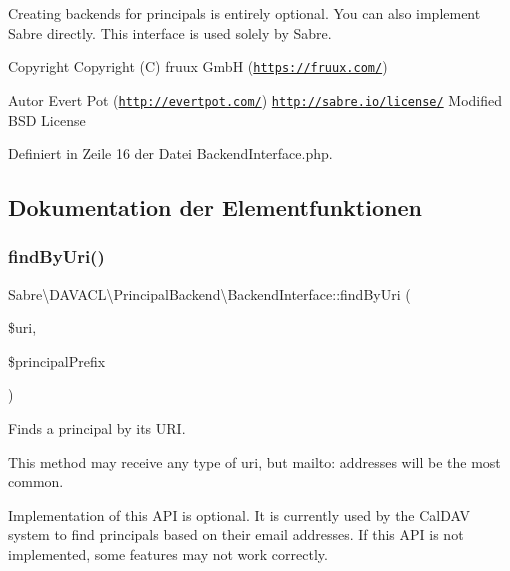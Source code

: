 Creating backends for principals is entirely optional. You can also implement Sabre directly. This interface is used solely by Sabre.

\begin{DoxyCopyright}{Copyright}
Copyright (C) fruux GmbH (\href{https://fruux.com/}{\tt https\+://fruux.\+com/}) 
\end{DoxyCopyright}
\begin{DoxyAuthor}{Autor}
Evert Pot (\href{http://evertpot.com/}{\tt http\+://evertpot.\+com/})  \href{http://sabre.io/license/}{\tt http\+://sabre.\+io/license/} Modified B\+SD License 
\end{DoxyAuthor}


Definiert in Zeile 16 der Datei Backend\+Interface.\+php.



\subsection{Dokumentation der Elementfunktionen}
\mbox{\label{interface_sabre_1_1_d_a_v_a_c_l_1_1_principal_backend_1_1_backend_interface_a949777beae7b9f2478278e080b7abc71}} 
\subsubsection{\texorpdfstring{find\+By\+Uri()}{findByUri()}}
{\footnotesize\ttfamily Sabre\textbackslash{}\+D\+A\+V\+A\+C\+L\textbackslash{}\+Principal\+Backend\textbackslash{}\+Backend\+Interface\+::find\+By\+Uri (\begin{DoxyParamCaption}\item[{}]{\$uri,  }\item[{}]{\$principal\+Prefix }\end{DoxyParamCaption})}

Finds a principal by its U\+RI.

This method may receive any type of uri, but mailto\+: addresses will be the most common.

Implementation of this A\+PI is optional. It is currently used by the Cal\+D\+AV system to find principals based on their email addresses. If this A\+PI is not implemented, some features may not work correctly.

